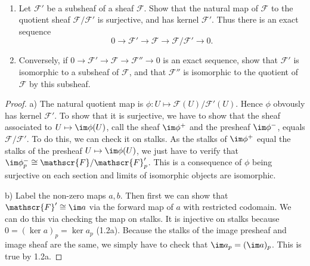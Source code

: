 \begin{exercise}%
	~
	\begin{enumerate}
		\item Let $\mathscr{F}' $ be a subsheaf of a sheaf $\mathscr{F} $. Show that the natural map of $\mathscr{F} $ to the quotient sheaf $\mathscr{F} / \mathscr{F}' $ is surjective, and has kernel $\mathscr{F}' $. Thus there is an exact sequence
		\[
			0 \to \mathscr{F}' \to \mathscr{F} \to \mathscr{F} / \mathscr{F}' \to 0
		.\] 
		\item Conversely, if $0 \to \mathscr{F}' \to \mathscr{F} \to \mathscr{F}''\to 0 $ is an exact sequence, show that $\mathscr{F}' $ is isomorphic to a subsheaf of $\mathscr{F} $, and that $\mathscr{F}'' $ is isomorphic to the quotient of $\mathscr{F} $ by this subsheaf.
	\end{enumerate}
\end{exercise}
\begin{proof}
	a) 
	The natural quotient map is $\phi: U \mapsto \mathscr{F}(U) / \mathscr{F}'(U)$.
	Hence $\phi$ obvously has kernel $\mathscr{F}' $.
	To show that it is surjective, we have to show that the sheaf associated to $U\mapsto \im \phi(U) $, call the sheaf $\im \phi^+ $ and the presheaf $\im \phi^- $, equals $\mathscr{F} / \mathscr{F}' $.
	To do this, we can check it on stalks.
	As the stalks of $\im \phi^+ $ equal the stalks of the presheaf $U\mapsto \im \phi(U) $, we just have to verify that $\im \phi^-_p \cong \mathscr{F} / \mathscr{F}'_p$.
	This is a consequence of $\phi $ being surjective on each section and limits of isomorphic objects are isomorphic.

	b)
	Label the non-zero maps $a,b $.
	Then first we can show that $\mathscr{F}' \cong \im a $ via the forward map of $a $ with restricted codomain.
	We can do this via checking the map on stalks.
	It is injective on stalks because $0 = (\ker a)_p = \ker a_p$ (1.2a).
	Because the stalks of the image presheaf and image sheaf are the same, we simply have to check that $\im a_p = (\im a)_p $.
	This is true by 1.2a.
\end{proof}

